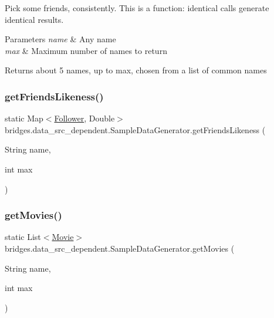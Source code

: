 Pick some friends, consistently. This is a function\+: identical calls generate identical results. 
\begin{DoxyParams}{Parameters}
{\em name} & Any name \\
\hline
{\em max} & Maximum number of names to return \\
\hline
\end{DoxyParams}
\begin{DoxyReturn}{Returns}
about 5 names, up to max, chosen from a list of common names 
\end{DoxyReturn}
\mbox{\label{classbridges_1_1data__src__dependent_1_1_sample_data_generator_a940034ad3107806e65741dca0a029d1b}} 
\subsubsection{\texorpdfstring{get\+Friends\+Likeness()}{getFriendsLikeness()}}
{\footnotesize\ttfamily static Map$<$\mbox{\hyperlink{classbridges_1_1data__src__dependent_1_1_follower}{Follower}}, Double$>$ bridges.\+data\+\_\+src\+\_\+dependent.\+Sample\+Data\+Generator.\+get\+Friends\+Likeness (\begin{DoxyParamCaption}\item[{String}]{name,  }\item[{int}]{max }\end{DoxyParamCaption})\hspace{0.3cm}{\ttfamily [static]}}

\mbox{\label{classbridges_1_1data__src__dependent_1_1_sample_data_generator_a5b654cc82316f320ad9b001aa7cdcfb9}} 
\subsubsection{\texorpdfstring{get\+Movies()}{getMovies()}}
{\footnotesize\ttfamily static List$<$\mbox{\hyperlink{classbridges_1_1data__src__dependent_1_1_movie}{Movie}}$>$ bridges.\+data\+\_\+src\+\_\+dependent.\+Sample\+Data\+Generator.\+get\+Movies (\begin{DoxyParamCaption}\item[{String}]{name,  }\item[{int}]{max }\end{DoxyParamCaption})\hspace{0.3cm}{\ttfamily [static]}}

